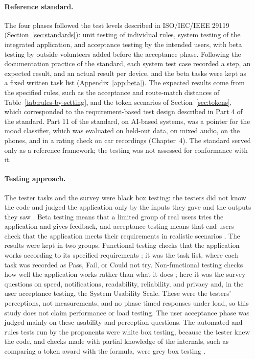 \paragraph{Reference standard.} The four phases followed the test levels described in ISO/IEC/IEEE 29119 (Section~\ref{sec:standards}): unit testing of individual rules, system testing of the integrated application, and acceptance testing by the intended users, with beta testing by outside volunteers added before the acceptance phase. Following the documentation practice of the standard, each system test case recorded a step, an expected result, and an actual result per device, and the beta tasks were kept as a fixed written task list (Appendix~\ref{app:beta}). The expected results come from the specified rules, such as the acceptance and route-match distances of Table~\ref{tab:rules-by-setting}, and the token scenarios of Section~\ref{sec:tokens}, which corresponded to the requirement-based test design described in Part 4 of the standard. Part 11 of the standard, on AI-based systems, was a pointer for the mood classifier, which was evaluated on held-out data, on mixed audio, on the phones, and in a rating check on car recordings (Chapter~4). The standard served only as a reference framework; the testing was not assessed for conformance with it.

\paragraph{Testing approach.} The tester tasks and the survey were black box testing: the testers did not know the code and judged the application only by the inputs they gave and the outputs they saw \cite{gfgbox}. Beta testing means that a limited group of real users tries the application and gives feedback, and acceptance testing means that end users check that the application meets their requirements in realistic scenarios \cite{gfgacceptance}. The results were kept in two groups. Functional testing checks that the application works according to its specified requirements \cite{gfgfunctional}; it was the task list, where each task was recorded as Pass, Fail, or Could not try. Non-functional testing checks how well the application works rather than what it does \cite{gfgnonfunctional}; here it was the survey questions on speed, notifications, readability, reliability, and privacy and, in the user acceptance testing, the System Usability Scale. These were the testers' perceptions, not measurements, and no phase timed responses under load, so this study does not claim performance or load testing. The user acceptance phase was judged mainly on these usability and perception questions. The automated and rules tests run by the proponents were white box testing, because the tester knew the code, and checks made with partial knowledge of the internals, such as comparing a token award with the formula, were grey box testing \cite{gfgbox}.

